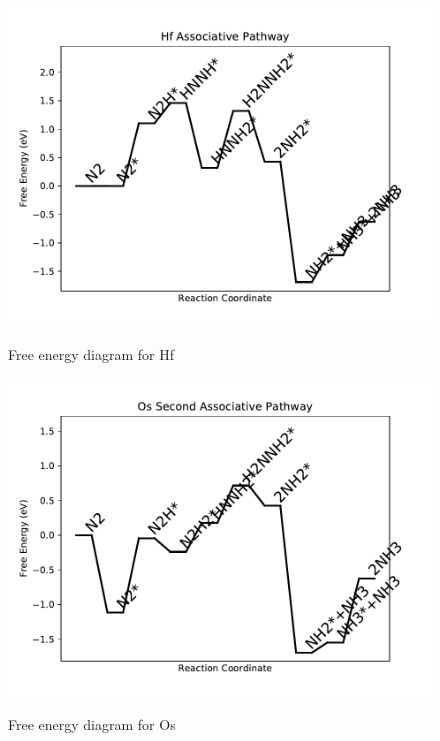 \documentclass{article}
\begin{document}
\begin{figure}
\includegraphics[width=1\linewidth]{data/plots/Hf_associative.pdf}
\label{fig:Hf_associative}
\caption{Free energy diagram for Hf}
\end{figure}

\begin{figure}
\includegraphics[width=1\linewidth]{data/plots/Os_associative_2.pdf}
\label{fig:Os_associative_2}
\caption{Free energy diagram for Os}
\end{figure}
\end{document}

